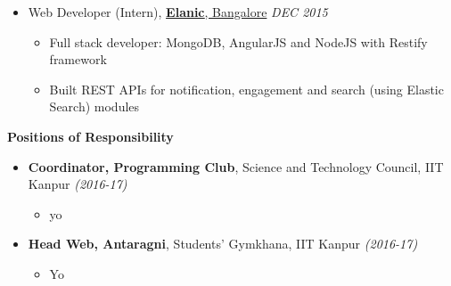\documentclass[letterpaper,11pt]{article}
\begin{document}
{\begin{itemize}
 \href{http://www.cse.iitk.ac.in/users/karkare/}{\textit{Supervisor: Prof. Amey Karkare, Dept. of CSE, IIT Kanpur}}\hfill \textit{Tested by $400$ students in Fall} $2015$\\
 \vspace{-1pt}
 \begin{itemize}
 \item Interpreter for C language in python, modelled memory artificially, handled external header files
\vspace{-1pt}
 \item Prompts user with corrections for runtime errors instead of crashing abruptly (unlike gcc)
\vspace{-1pt}
\item Web interface to \textbf{simulate C codes} interpreted by Cimulator to provide visual cues to the user
\vspace{-6pt}
\end{itemize}
\item Web Developer (Intern), \href{http://elanic.in//}{\textbf{Elanic}, Bangalore} \hfill \textit{DEC 2015}
\vspace{-6pt}
\begin{itemize}
\item Full stack developer: MongoDB, AngularJS and NodeJS with Restify framework
\vspace{-2pt}
\item Built REST APIs for notification, engagement and search (using Elastic Search) modules
\end{itemize}
\vspace{-5pt}
\end{itemize}

\Large{\textbf{Positions of Responsibility}}
\normalsize
\vspace{-6pt}
\begin{itemize}
\item \textbf{Coordinator, Programming Club}, Science and Technology Council, IIT Kanpur \hfill \textit{(2016-17)}
\vspace{-6pt}
\begin{itemize}
\item yo
\end{itemize}
\vspace{-8pt}
\item \textbf{Head Web, Antaragni}, Students' Gymkhana, IIT Kanpur \hfill \textit{(2016-17)}
\vspace{-6pt}
\begin{itemize}
\item Yo
\end{itemize}
\end{itemize}
}
\end{document}
